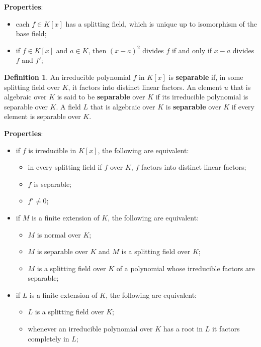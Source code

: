 \documentclass[11pt]{amsart}
\theoremstyle{definition}
\newtheorem*{definition*}{Definition}
\renewcommand\:{\colon}
\newcommand{\1}{\mathds{1}}
\begin{document}
\noindent \textbf{Properties}:
\begin{itemize}[leftmargin=*]\setlength\itemsep{0em}
	\item each $f \in K[x]$ has a splitting field, which is unique up to isomorphism of the base field;
	\item if $f \in K[x]$ and $a \in K$, then $(x-a)^2$ divides $f$ if and only if $x-a$ divides $f$ and $f'$;
\end{itemize}

\begin{definition*}
	An irreducible polynomial $f$ in $K[x]$ is \textbf{separable} if, in some splitting field over $K$, it factors into distinct linear factors. An element $u$ that is algebraic over $K$ is said to be \textbf{separable} over $K$ if its irreducible polynomial is separable over $K$. A field $L$ that is algebraic over $K$ is \textbf{separable} over $K$ if every element is separable over $K$.
\end{definition*}

\noindent \textbf{Properties}:
\begin{itemize}[leftmargin=*]\setlength\itemsep{0em}
	\item if $f$ is irreducible in $K[x]$, the following are equivalent:
	\begin{itemize}[leftmargin=*]\setlength\itemsep{0em}
		\item in every splitting field if $f$ over $K$, $f$ factors into distinct linear factors;
		\item $f$ is separable;
		\item $f' \neq 0$;
	\end{itemize}
	\item if $M$ is a finite extension of $K$, the following are equivalent:
	\begin{itemize}[leftmargin=12.5pt]\setlength\itemsep{0em}
		\item $M$ is normal over $K$;
		\item $M$ is separable over $K$ and $M$ is a splitting field over $K$;
		\item $M$ is a splitting field over $K$ of a polynomial whose irreducible factors are separable;
	\end{itemize}
	\item if $L$ is a finite extension of $K$, the following are equivalent:
	\begin{itemize}[leftmargin=12.5pt]\setlength\itemsep{0em}
		\item $L$ is a splitting field over $K$;
		\item whenever an irreducible polynomial over $K$ has a root in $L$ it factors completely in $L$;
	\end{itemize}
\end{itemize}
\end{document}
